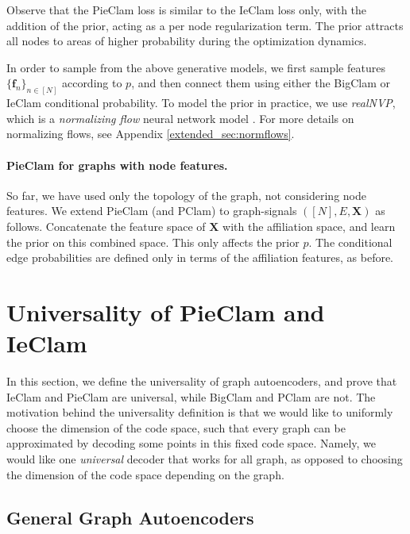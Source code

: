 \documentclass[letterpaper]{article} %
\begin{document}
Observe that the PieClam loss is similar to the IeClam loss only, with the addition of the prior, acting as a per node regularization term. The prior attracts all nodes to areas of higher probability during the optimization dynamics.

In order to sample from the above generative models, we first sample features $\{\mathbf{f}_n\}_{n\in [N]}$ according to $p$, and then connect them using either the BigClam or IeClam conditional probability.
%
To model the prior in practice, we use \emph{realNVP},  which is a \emph{normalizing flow} neural network model \cite{dinh2016density}. For more details on normalizing flows, see Appendix \ref{extended_sec:normflows}.



\paragraph{PieClam for graphs with node features.}
\label{sec:pieclam for graphs with node features}

So far, we have used only the topology of the graph, not considering node features. 
We extend PieClam (and PClam) to graph-signals $([N], E, \mathbf{X})$ as follows. Concatenate the feature space of $\mathbf{X}$ with the affiliation space, and learn the prior on this combined space. This only affects the prior $p$. The conditional edge probabilities are  defined only in terms of the affiliation features, as before.

\section{Universality of PieClam and IeClam}

In this section, we define the universality of graph autoencoders, and prove that IeClam and PieClam are universal, while BigClam and PClam are not. The motivation behind the universality definition is that we would like to uniformly choose the dimension of the code space, such that every graph can be approximated by decoding some points in this fixed code space. Namely, we would like one \emph{universal} decoder that works for all graph, as opposed to choosing the dimension of the code space depending on the graph.

\subsection{General Graph Autoencoders}
\end{document}

